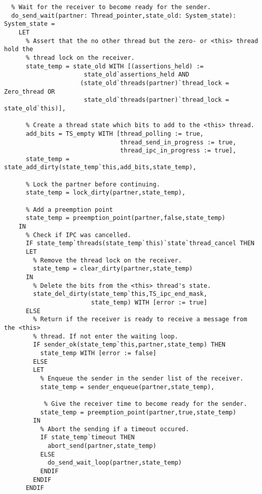 \begin{lstlisting}
  % Wait for the receiver to become ready for the sender.
  do_send_wait(partner: Thread_pointer,state_old: System_state): System_state =
    LET
      % Assert that the no other thread but the zero- or <this> thread hold the
      % thread lock on the receiver.
      state_temp = state_old WITH [(assertions_held) :=
                      state_old`assertions_held AND 
                     (state_old`threads(partner)`thread_lock = Zero_thread OR
                      state_old`threads(partner)`thread_lock = state_old`this)],
 
      % Create a thread state which bits to add to the <this> thread.
      add_bits = TS_empty WITH [thread_polling := true,
                                thread_send_in_progress := true,
                                thread_ipc_in_progress := true],
      state_temp = state_add_dirty(state_temp`this,add_bits,state_temp),
      
      % Lock the partner before continuing.
      state_temp = lock_dirty(partner,state_temp),

      % Add a preemption point
      state_temp = preemption_point(partner,false,state_temp) 
    IN
      % Check if IPC was cancelled.
      IF state_temp`threads(state_temp`this)`state`thread_cancel THEN
      LET
        % Remove the thread lock on the receiver.
        state_temp = clear_dirty(partner,state_temp)
      IN
        % Delete the bits from the <this> thread's state.
        state_del_dirty(state_temp`this,TS_ipc_end_mask,
                        state_temp) WITH [error := true]
      ELSE
        % Return if the receiver is ready to receive a message from the <this>
        % thread. If not enter the waiting loop.
        IF sender_ok(state_temp`this,partner,state_temp) THEN
          state_temp WITH [error := false]
        ELSE
        LET
          % Enqueue the sender in the sender list of the receiver.
          state_temp = sender_enqueue(partner,state_temp),

           % Give the receiver time to become ready for the sender.
          state_temp = preemption_point(partner,true,state_temp)
        IN 
          % Abort the sending if a timeout occured.
          IF state_temp`timeout THEN
            abort_send(partner,state_temp)        
          ELSE
            do_send_wait_loop(partner,state_temp)
          ENDIF
        ENDIF
      ENDIF


\end{lstlisting}
